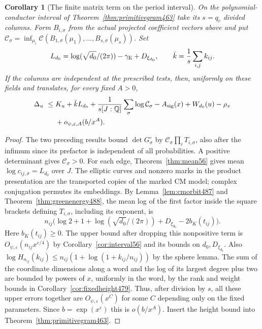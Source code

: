 \documentclass[a4paper,11pt]{article}
\newtheorem{corollary}[proposition]{Corollary}
\theoremstyle{definition}
\theoremstyle{remark}
\numberwithin{equation}{section}
\begin{document}
\begin{corollary}[The finite matrix term on the period interval]\leavevmode
\label{cor:commoncapacity489}
On the polynomial-conductor interval of
Theorem~\ref{thm:primitivegram463} take its \(s=q_c\) divided
columns. Form \(B_{i,\sigma}\) from the actual projected coefficient
vectors above and put
\(\mathcal C_\sigma=\inf_{\mu_i}\mathcal C(B_{1,\sigma}(\mu_1),
\ldots,B_{s,\sigma}(\mu_s))\). Set
\[
 L_{d_0}=\log(\sqrt{d_0}/(2\pi))-\gamma_{\rm E}+D_{\xi_{d_0}},
 \qquad \bar k={1\over s}\sum_{i,j} k_{ij}.
\]
If the columns are independent at the prescribed tests, then,
uniformly on these fields and translates, for every fixed \(A>0\),
\[
 \begin{aligned}
 \Delta_u\ \le{}& K_u+\bar k L_{d_0}
             +{1\over s[J:\mathbb Q]}\sum_\sigma\log\mathcal C_\sigma
             -A_{\rm sig}(x)+W_{d_0}(u)-\rho_x\\
             &+o_{\psi,\varepsilon,A}(b/x^A).
 \end{aligned}
\]
\end{corollary}
\begin{proof}
The two preceding results bound \(\det G^\circ_\sigma\) by
\(\mathcal C_\sigma\prod_iT_{i,\sigma}\), also after the infimum
since its prefactor is independent of all probabilities. A positive
determinant gives \(\mathcal C_\sigma>0\). For each edge,
Theorem~\ref{thm:mean56} gives mean \(\log c_{ij,\sigma}=L_{d_0}\)
over \(J\). The elliptic curves and nonzero marks in the product
presentation are the transported copies of the marked CM model;
complex conjugation permutes its embeddings. By
Lemma~\ref{lem:cmorbit487} and Theorem~\ref{thm:greenenergy488}, the
mean log of the first factor inside the square brackets defining
\(T_{i,\sigma}\), including its exponent, is
\[
 n_{ij}\big(\log2+1+\log(\sqrt{d_0}/(2\pi))
                      +D_{\xi_{d_0}}-2 b_K(t_{ij})\big).
\]
Here \(b_K(t_{ij})\ge0\). The upper bound after dropping this
nonpositive term is \(O_{\psi,\varepsilon}(n_{ij}x^{\varepsilon/4})\)
by Corollary~\ref{cor:interval56} and its bounds on \(d_0,D_{\xi_{d_0}}\).
Also \(\log H_{n_{ij}}(k_{ij})\le
n_{ij}(1+\log(1+k_{ij}/n_{ij}))\) by the sphere lemma.
The sum of the coordinate dimensions along a word and the log of
its largest degree plus two are bounded by powers of \(x\), uniformly
in the word, by the rank and weight bounds in
Corollary~\ref{cor:fixedheight479}. Thus, after division by \(s\),
all these upper errors together are \(O_{\psi,\varepsilon}(x^C)\)
for some \(C\) depending only on the fixed parameters. Since
\(b=\exp(x^\varepsilon)\) this is \(o(b/x^A)\). Insert the height
bound into Theorem~\ref{thm:primitivegram463}.
\end{proof}
\end{document}
